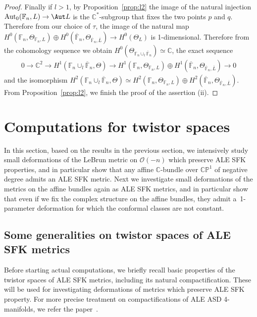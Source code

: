 \begin{proof}
Finally if $l>1$, by Proposition~\ref{prop:l2} the image of the natural injection ${\rm{Aut}}_0(\mathbb{F}_n,L)\to \Aut
L$ is the $\mathbb{C}^*$-subgroup that f\/ixes the two points $p$ and $q$.
Therefore from our choice of $\tau$, the image of the natural map $H^0(\mathbb{F}_n, \Theta_{\mathbb{F}_n,L}) \oplus H^0
(\overline{\mathbb{F}}_n,\Theta_{\overline{\mathbb{F}}_n,\overline L})\to H^0(\Theta_L)$ is 1-dimensional.
Therefore from the cohomology sequence we obtain $H^0(\Theta_{\mathbb{F}_n\cup_l\overline{\mathbb{F}}_n})
\simeq\mathbb{C}$, the exact sequence
\begin{gather*}
0
\longrightarrow
\mathbb{C}^2
\longrightarrow
H^1 (\mathbb{F}_n \cup_l \overline{\mathbb{F}}_n,\Theta)
\longrightarrow
H^1(\mathbb{F}_n, \Theta_{\mathbb{F}_n,L}) \oplus H^1
(\overline{\mathbb{F}}_n,\Theta_{\overline{\mathbb{F}}_n,\overline L})
\longrightarrow
0
\end{gather*}
and the isomorphism $H^2 (\mathbb{F}_n \cup_l \overline{\mathbb{F}}_n,\Theta) \simeq H^2(\mathbb{F}_n,
\Theta_{\mathbb{F}_n,L}) \oplus H^2 (\overline{\mathbb{F}}_n,\Theta_{\overline{\mathbb{F}}_n,\overline L})$.
From Proposition~\ref{prop:l2}, we f\/inish the proof of the assertion (ii).
\end{proof}

\section{Computations for twistor spaces}
\label{explicit}

In this section, based on the results in the previous section, we intensively study small deformations of the LeBrun
metric on $\mathscr O(-n)$ which preserve ALE SFK properties, and in particular show that any af\/f\/ine
$\mathbb{C}$-bundle over $\mathbb{CP}^1$ of negative degree admits an ALE SFK metric.
Next we investigate small deformations of the metrics on the af\/f\/ine bundles again as ALE SFK metrics, and in
particular show that even if we f\/ix the complex structure on the af\/f\/ine bundles, they admit a~1-parameter
deformation for which the conformal classes are not constant.

\subsection{Some generalities on twistor spaces of ALE SFK metrics} %

Before starting actual computations, we brief\/ly recall basic properties of the twistor spaces of ALE SFK metrics,
including its natural compactif\/ication.
These will be used for investigating deformations of metrics which preserve ALE SFK property.
For more precise treatment on compactif\/ications of ALE ASD 4-manifolds, we refer the paper~\cite{V}.

